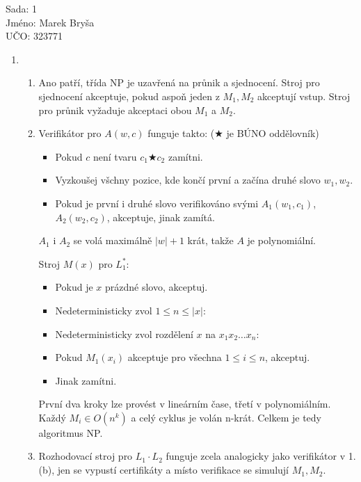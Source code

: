 \documentclass[a4paper,10pt]{extarticle}
\begin{document}
\begin{flushleft}
Sada: 1 \\ 
Jméno: Marek Bryša \\
UČO: 323771\\
\end{flushleft}
\begin{enumerate}
  \item
	\begin{enumerate}
		\item
			Ano patří, třída NP je uzavřená na průnik a sjednocení. Stroj pro sjednocení akceptuje, pokud aspoň jeden z $M_1,M_2$ akceptují vstup. Stroj pro průnik vyžaduje akceptaci obou $M_1$ a $M_2$.
		\item
			Verifikátor pro $A(w,c)$ funguje takto: ($\bigstar$ je BÚNO oddělovník)
			\begin{itemize}
				\item Pokud $c$ není tvaru $c_1\bigstar c_2$ zamítni.			
				\item Vyzkoušej všchny pozice, kde končí první a začína druhé slovo $w_1, w_2$.
				\item Pokud je první i druhé slovo verifikováno svými $A_1(w_1,c_1)$, $A_2(w_2,c_2)$, akceptuje, jinak zamítá.
			\end{itemize}
			$A_1$ i $A_2$ se volá maximálně $|w|+1$ krát, takže $A$ je polynomiální.
			
			Stroj $M(x)$ pro $L_1^*$:
			\begin{itemize}
				\item	Pokud je $x$ prázdné slovo, akceptuj.
				\item Nedeterministicky zvol $1\leq n \leq |x|$:
				\item Nedeterministicky zvol rozdělení $x$ na $x_1x_2\dots x_n$:
				\item Pokud $M_1(x_i)$ akceptuje pro všechna $1\leq i \leq n$, akceptuj.
				\item Jinak zamítni.
			\end{itemize}
			První dva kroky lze provést v lineárním čase, třetí v polynomiálním. Každý $M_i\in O(n^k)$ a celý cyklus je volán n-krát. Celkem je tedy algoritmus NP.
		\item
			Rozhodovací stroj pro $L_1\cdot L_2$ funguje zcela analogicky jako verifikátor v 1.(b), jen se vypustí certifikáty a místo verifikace se simulují $M_1, M_2$.
			

\end{enumerate}
\end{enumerate}
\end{document}
